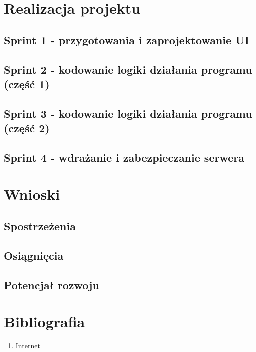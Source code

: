 \documentclass[12pt,a4paper]{article}
\begin{document}
\newpage
\section{Realizacja projektu}
	\subsection{Sprint 1 - przygotowania i zaprojektowanie UI}
    \subsection{Sprint 2 - kodowanie logiki działania programu (część 1)}
    \subsection{Sprint 3 - kodowanie logiki działania programu (część 2)}
    \subsection{Sprint 4 - wdrażanie i zabezpieczanie serwera}






\newpage
\section{Wnioski}
    \subsection{Spostrzeżenia}
    \subsection{Osiągnięcia}
    \subsection{Potencjał rozwoju}


\newpage
\section{Bibliografia}
\begin{enumerate}
	\item Internet
\end{enumerate}
\end{document}
